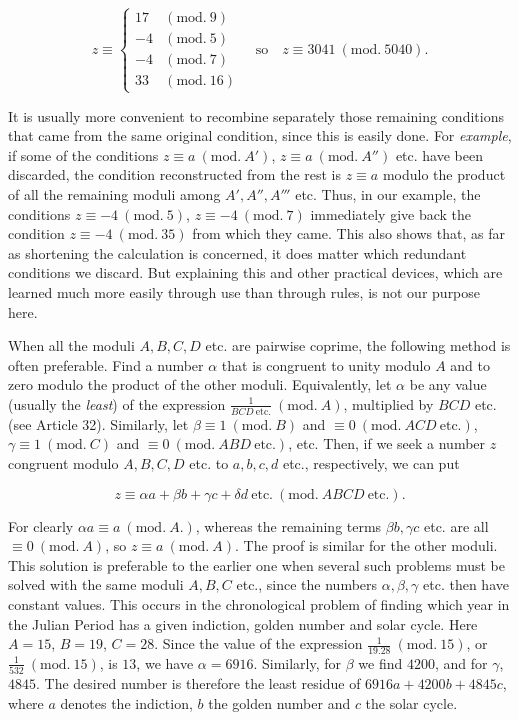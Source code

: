 \[
z\equiv\left\{\begin{array}{rl}
17 & (\mathrm{mod.}\ 9)\\
-4 & (\mathrm{mod.}\ 5)\\
-4 & (\mathrm{mod.}\ 7)\\
33 & (\mathrm{mod.}\ 16)
\end{array}\right.
\quad\text{so}\quad z\equiv 3041\ (\mathrm{mod.}\ 5040).
\]

It is usually more convenient to recombine separately those remaining conditions that came from the same original condition, since this is easily done. For \emph{example}, if some of the conditions $z\equiv a\ (\mathrm{mod.}\ A')$, $z\equiv a\ (\mathrm{mod.}\ A'')$ etc. have been discarded, the condition reconstructed from the rest is $z\equiv a$ modulo the product of all the remaining moduli among $A',A'',A'''$ etc. Thus, in our example, the conditions $z\equiv -4\ (\mathrm{mod.}\ 5)$, $z\equiv -4\ (\mathrm{mod.}\ 7)$ immediately give back the condition $z\equiv -4\ (\mathrm{mod.}\ 35)$ from which they came. This also shows that, as far as shortening the calculation is concerned, it does matter which redundant conditions we discard. But explaining this and other practical devices, which are learned much more easily through use than through rules, is not our purpose here.


When all the moduli $A,B,C,D$ etc. are pairwise coprime, the following method is often preferable. Find a number $\alpha$ that is congruent to unity modulo $A$ and to zero modulo the product of the other moduli. Equivalently, let $\alpha$ be any value (usually the \emph{least}) of the expression $\frac{1}{BCD\ \mathrm{etc.}}\ (\mathrm{mod.}\ A)$, multiplied by $BCD$ etc. (see Article 32). Similarly, let $\beta\equiv 1\ (\mathrm{mod.}\ B)$ and $\equiv 0\ (\mathrm{mod.}\ ACD\ \mathrm{etc.})$, $\gamma\equiv 1\ (\mathrm{mod.}\ C)$ and $\equiv 0\ (\mathrm{mod.}\ ABD\ \mathrm{etc.})$, etc. Then, if we seek a number $z$ congruent modulo $A,B,C,D$ etc. to $a,b,c,d$ etc., respectively, we can put

\[
z\equiv\alpha a+\beta b+\gamma c+\delta d\ \mathrm{etc.}\ (\mathrm{mod.}\ ABCD\ \mathrm{etc.}).
\]

For clearly $\alpha a\equiv a\ (\mathrm{mod.}\ A.)$, whereas the remaining terms $\beta b,\gamma c$ etc. are all $\equiv 0\ (\mathrm{mod.}\ A)$, so $z\equiv a\ (\mathrm{mod.}\ A)$. The proof is similar for the other moduli. This solution is preferable to the earlier one when several such problems must be solved with the same moduli $A,B,C$ etc., since the numbers $\alpha,\beta,\gamma$ etc. then have constant values. This occurs in the chronological problem of finding which year in the Julian Period has a given indiction, golden number and solar cycle. Here $A=15$, $B=19$, $C=28$. Since
the value of the expression $\frac{1}{19.28}\ (\mathrm{mod.}\ 15)$, or $\frac{1}{532}\ (\mathrm{mod.}\ 15)$, is $13$, we have $\alpha=6916$. Similarly, for $\beta$ we find $4200$, and for $\gamma$, $4845$. The desired number is therefore the least residue of $6916a+4200b+4845c$, where $a$ denotes the indiction, $b$ the golden number and $c$ the solar cycle.

